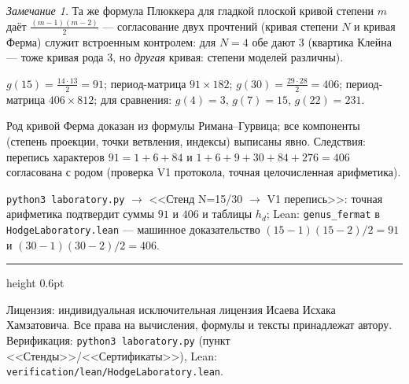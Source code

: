 \documentclass[11pt,a4paper]{article}
\theoremstyle{plain}
\theoremstyle{definition}
\theoremstyle{remark}
\newtheorem{remark}[theorem]{Замечание}
\begin{document}
\begin{remark}
Та же формула Плюккера для гладкой плоской кривой степени $m$
даёт $\tfrac{(m-1)(m-2)}2$ --- согласование двух прочтений
(кривая степени $N$ и кривая Ферма) служит встроенным контролем:
для $N=4$ обе дают $3$ (квартика Клейна --- тоже кривая рода $3$,
но \emph{другая} кривая: степени моделей различны).
\end{remark}

\begin{databox}[числа]
$g(15)=\tfrac{14\cdot13}2=91$; период-матрица $91\times182$;
$g(30)=\tfrac{29\cdot28}2=406$; период-матрица $406\times812$;
для сравнения: $g(4)=3$, $g(7)=15$, $g(22)=231$.
\end{databox}

\begin{statusbox}[итог]
Род кривой Ферма доказан из формулы Римана--Гурвица; все компоненты
(степень проекции, точки ветвления, индексы) выписаны явно.
Следствия: перепись характеров $91=1+6+84$ и
$1+6+9+30+84+276=406$ согласована с родом (проверка V1 протокола,
точная целочисленная арифметика).
\end{statusbox}

\begin{verifybox}
\texttt{python3 laboratory.py} $\to$ <<Стенд N=15/30 $\to$ V1
перепись>>: точная арифметика подтвердит суммы $91$ и $406$ и
таблицы $h_d$; Lean: \texttt{genus\_fermat} в
\texttt{HodgeLaboratory.lean} --- машинное доказательство
$(15-1)(15-2)/2=91$ и $(30-1)(30-2)/2=406$.
\end{verifybox}

\vfill
{\color{linkblue}\hrule height 0.6pt}
\vspace{0.5em}
{\small\color{gray}
Лицензия: индивидуальная исключительная лицензия Исаева Исхака Хамзатовича.
Все права на вычисления, формулы и тексты принадлежат автору.
Верификация: \texttt{python3 laboratory.py} (пункт <<Стенды>>/<<Сертификаты>>),
Lean: \texttt{verification/lean/HodgeLaboratory.lean}.
}
\end{document}
